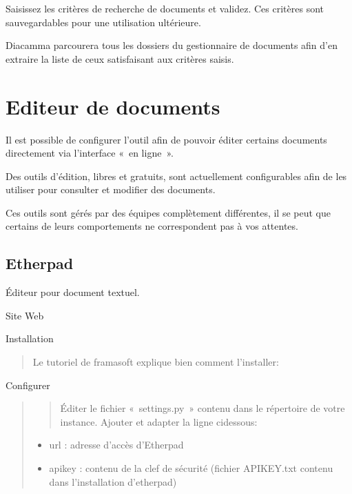 \documentclass[a4paper,10pt,oneside,french]{sphinxmanual}
\begin{document}
\sphinxAtStartPar
Saisissez les critères de recherche de documents et validez. Ces critères sont sauvegardables pour une utilisation ultérieure.

\sphinxAtStartPar
Diacamma parcourera tous les dossiers du gestionnaire de documents afin d’en extraire la liste de ceux satisfaisant aux critères saisis.

\sphinxstepscope


\section{Editeur de documents}
\label{\detokenize{documents/editor:editeur-de-documents}}\label{\detokenize{documents/editor::doc}}
\sphinxAtStartPar
Il est possible de configurer l’outil afin de pouvoir éditer certains documents directement via l’interface « en ligne ».

\sphinxAtStartPar
Des outils d’édition, libres et gratuits, sont actuellement configurables afin de les utiliser pour consulter et modifier des documents.

\sphinxAtStartPar
{} Ces outils sont gérés par des équipes complètement différentes, il se peut que certains de leurs comportements ne correspondent pas à vos attentes.


\subsection{Etherpad}
\label{\detokenize{documents/editor:etherpad}}
\sphinxAtStartPar
Éditeur pour document textuel.

\sphinxAtStartPar
Site Web
\begin{quote}

\sphinxAtStartPar
{}
\end{quote}

\sphinxAtStartPar
Installation
\begin{quote}

\sphinxAtStartPar
Le tutoriel de framasoft explique bien comment l’installer: 
\end{quote}

\sphinxAtStartPar
Configurer
\begin{quote}
\begin{quote}

\sphinxAtStartPar
Éditer le fichier « settings.py » contenu dans le répertoire de votre instance.
Ajouter et adapter la ligne ci\sphinxhyphen{}dessous:
\end{quote}
\begin{itemize}
\item {} 
\sphinxAtStartPar
url : adresse d’accès d’Etherpad

\item {} 
\sphinxAtStartPar
apikey : contenu de la clef de sécurité (fichier APIKEY.txt contenu dans l’installation d’etherpad)

\end{itemize}
\end{quote}
\end{document}

